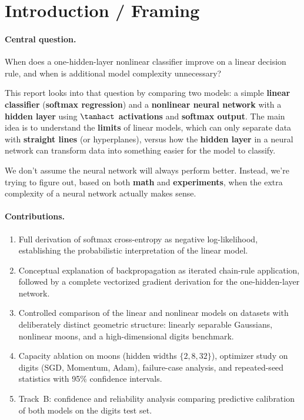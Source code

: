 \documentclass[sigconf,screen,nonacm]{acmart}
\begin{document}
\section{Introduction / Framing}

\paragraph{Central question.}
When does a one-hidden-layer nonlinear classifier improve on a linear decision rule, and when is additional model complexity unnecessary?

This report looks into that question by comparing two models: a simple \textbf{linear classifier} (\textbf{softmax regression}) and a \textbf{nonlinear neural network} with a \textbf{hidden layer} using \textbf{$\tanhact$ activations} and \textbf{softmax output}. The main idea is to understand the \textbf{limits} of linear models, which can only separate data with \textbf{straight lines} (or hyperplanes), versus how the \textbf{hidden layer} in a neural network can transform data into something easier for the model to classify.

We don't assume the neural network will always perform better. Instead, we're trying to figure out, based on both \textbf{math} and \textbf{experiments}, when the extra complexity of a neural network actually makes sense.

\paragraph{Contributions.}
\begin{enumerate}[leftmargin=*,itemsep=0.25em]
    \item Full derivation of softmax cross-entropy as negative log-likelihood, establishing the probabilistic interpretation of the linear model.
    \item Conceptual explanation of backpropagation as iterated chain-rule application, followed by a complete vectorized gradient derivation for the one-hidden-layer network.
    \item Controlled comparison of the linear and nonlinear models on datasets with deliberately distinct geometric structure: linearly separable Gaussians, nonlinear moons, and a high-dimensional digits benchmark.
    \item Capacity ablation on moons (hidden widths $\{2, 8, 32\}$), optimizer study on digits (SGD, Momentum, Adam), failure-case analysis, and repeated-seed statistics with 95\% confidence intervals.
    \item Track~B: confidence and reliability analysis comparing predictive calibration of both models on the digits test set.
\end{enumerate}
\end{document}
